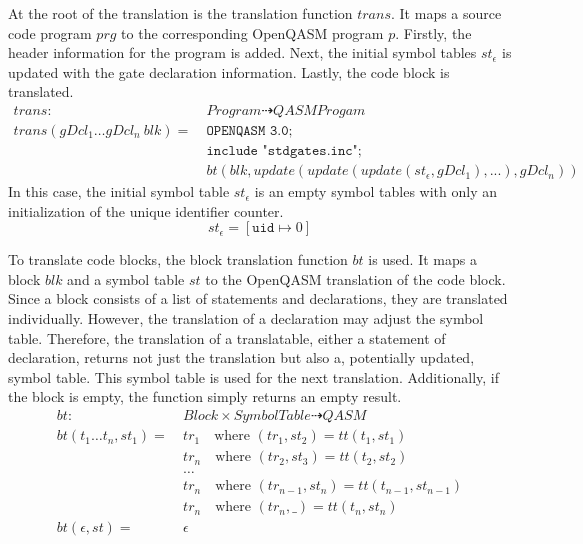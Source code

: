 At the root of the translation is the translation function $trans$. It maps a source code program $prg$ to the corresponding OpenQASM program $p$. Firstly, the header information for the program is added. Next, the initial symbol tables $st_\epsilon$ is updated with the gate declaration information. Lastly, the code block is translated. 
\begin{align*}
    trans : \ & Program \dashrightarrow QASMProgam\\
    trans(gDcl_1 \dots gDcl_n \ blk) = \ & \texttt{OPENQASM 3.0;}\\
                & \texttt{include "stdgates.inc";}\\
                & bt(blk, update(update(update(st_\epsilon, gDcl_1), ...), gDcl_n))
\end{align*}  
In this case, the initial symbol table $st_\epsilon$ is an empty symbol tables with only an initialization of the unique identifier counter. 
\begin{equation*}
    st_\epsilon = [ \texttt{uid} \mapsto 0 ]
\end{equation*}

To translate code blocks, the block translation function $bt$ is used. It maps a block $blk$ and a symbol table $st$ to the OpenQASM translation of the code block. Since a block consists of a list of statements and declarations, they are translated individually. However, the translation of a declaration may adjust the symbol table. Therefore, the translation of a translatable, \ie either a statement of declaration, returns not just the translation but also a, potentially updated, symbol table. This symbol table is used for the next translation. Additionally, if the block is empty, the function simply returns an empty result. 
\begin{align*}
    bt : \ & Block \times SymbolTable \dashrightarrow QASM\\
    bt(t_1 \dots t_n, st_1) = \ &  tr_1 \quad \text{where } (tr_1, st_2) = tt(t_1, st_1)\\
    & tr_n \quad \text{where } (tr_2, st_3) = tt(t_2, st_2)\\
    & \dots\\
    & tr_n \quad \text{where } (tr_{n - 1}, st_n) = tt(t_{n - 1}, st_{n - 1})\\
    & tr_n \quad \text{where } (tr_n, \_) = tt(t_n, st_n)\\
    bt(\epsilon, st) = \ &  \epsilon 
\end{align*}

